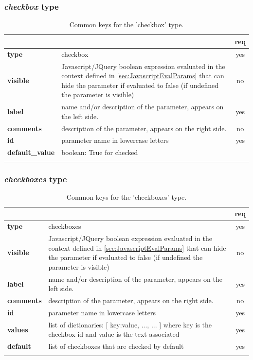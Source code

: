 \subsubsection{ \emph{checkbox} type}

\begin{longtable}{|>{\bf}L{\linewidth}|L{\linewidth}|c|}
\hline
      &  & {\bf req} 
\tabularnewline \hline \hline
 type  & checkbox  & yes \\ \hline
 visible  & Javascript/JQuery boolean expression evaluated in the context defined 
              in \ref{sec:JavascriptEvalParams} that can hide the parameter if
            evaluated to false (if undefined the parameter is visible)& no \\ \hline
 label  & name and/or description of the parameter, appears on the left side. & yes
                      \\ \hline
 comments & description of the parameter, appears on the right side. & no
                      \\ \hline
 id         & parameter name in lowercase letters  & yes \\ \hline
 default\_value & boolean: True for checked & \\ \hline
\caption{Common keys for the 'checkbox' type.}
\end{longtable}

\subsubsection{ \emph{checkboxes} type}

\begin{longtable}{|>{\bf}L{\linewidth}|L{\linewidth}|c|}
\hline
      &  & {\bf req} 
\tabularnewline \hline \hline
 type  & checkboxes   & yes \\ \hline
 visible  & Javascript/JQuery boolean expression evaluated in the context defined 
              in \ref{sec:JavascriptEvalParams} that can hide the parameter if
            evaluated to false (if undefined the parameter is visible)& no \\ \hline
 label  & name and/or description of the parameter, appears on the left side. & yes
                      \\ \hline
 comments & description of the parameter, appears on the right side. & no
                      \\ \hline
 id         & parameter name in lowercase letters  & yes \\ \hline
 values     & list of dictionaries: [ {key:value, ...}, ... ]
            where key is the checkbox id and value is the text associated
            & yes \\ \hline
 default     & list of checkboxes that are checked by default  & yes \\ \hline
\caption{Common keys for the 'checkboxes' type.}
\end{longtable}


